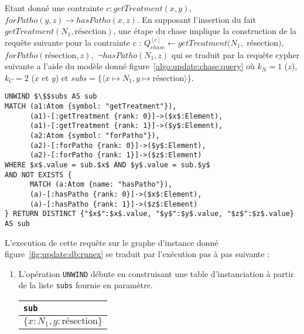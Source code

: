 \begin{example}
    \label{ex:update:chase:query}
    Etant donné une contrainte $c : getTreatment(x, y),$ $forPatho(y, z) \to hasPatho(x, z)$.
    En supposant l'insertion du fait $getTreatment(N_1, \text{résection})$, une étape du chase implique la construction de la requête suivante pour la contrainte $c$ : $Q_{chase}^{[c]} \gets getTreatment(N_1,$ $\text{résection}),$ $forPatho(\text{résection}, z),$ $\lnot hasPatho(N_1, z)$ qui se traduit par la requête \gls{cypher} suivante a l'aide du modèle donné figure~\ref{algo:update:chase:query} où $k_N = 1$ ($z$), $k_C = 2$ ($x$ et $y$) et $subs = \{\langle x \mapsto N_1, y \mapsto \text{résection} \rangle\}$.

    \begin{lstlisting}[mathescape, language=cypher]
UNWIND $\$$subs AS sub
MATCH (a1:Atom {symbol: "getTreatment"}),
      (a1)-[:getTreatment {rank: 0}]->($x$:Element),
      (a1)-[:getTreatment {rank: 1}]->($y$:Element),
      (a2:Atom {symbol: "forPatho"}),
      (a2)-[:forPatho {rank: 0}]->($y$:Element),
      (a2)-[:forPatho {rank: 1}]->($z$:Element)
WHERE $x$.value = sub.$x$ AND $y$.value = sub.$y$
AND NOT EXISTS {
      MATCH (a:Atom {name: "hasPatho"}),
      (a)-[:hasPatho {rank: 0}]->($x$:Element),
      (a)-[:hasPatho {rank: 1}]->($z$:Element)
} RETURN DISTINCT {"$x$":$x$.value, "$y$":$y$.value, "$z$":$z$.value} AS sub
\end{lstlisting}

    L'execution de cette requête sur le graphe d'instance donné figure~\ref{fig:update:db:runex} se traduit par l'exécution pas à pas suivante :
    \begin{enumerate}[label=\emph{Etape~\arabic*},leftmargin=*]
        \item L'opération \verb|UNWIND| débute en construisant une table d'instanciation à partir de la liste \verb|subs| fournie en paramètre.
              \begin{center}
                  \begin{tabular}{l}
                      \hline
                      \verb|sub|                        \\
                      \hline
                      $\{x: N_1, y: \text{résection}\}$ \\
                      \hline
                  \end{tabular}
              \end{center}


\end{enumerate}
\end{example}
